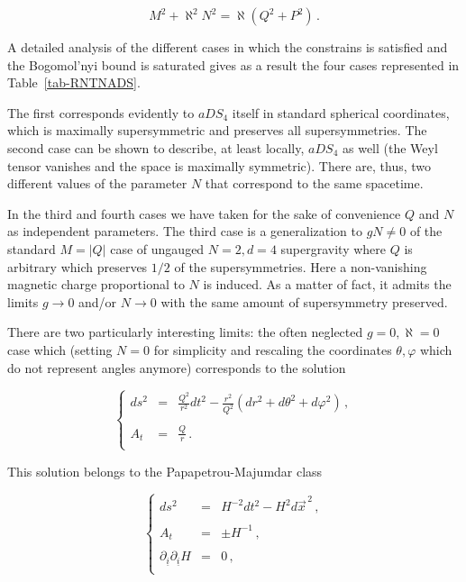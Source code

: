 \documentclass[12pt,a4paper]{article}
\begin{document}
\begin{equation}
M^{2} +\aleph^{2}N^{2}= \aleph (Q^{2}+P^{2})\, .  
\end{equation}

A detailed analysis of the different cases in which the constrains is
satisfied and the Bogomol'nyi bound is saturated gives as a result the
four cases represented in Table~\ref{tab-RNTNADS}. 

The first corresponds evidently to $aDS_{4}$ itself in standard
spherical coordinates, which is maximally supersymmetric and
preserves all supersymmetries. The second case can be shown to
describe, at least locally, $aDS_{4}$ as well (the Weyl tensor
vanishes and the space is maximally symmetric). There are, thus, two
different values of the parameter $N$ that correspond to the same
spacetime.

In the third and fourth cases we have taken for the sake of
convenience $Q$ and $N$ as independent parameters.  The third case is
a generalization to $gN\neq 0$ of the standard $M=|Q|$ case of
ungauged $N=2,d=4$ supergravity where $Q$ is arbitrary which preserves
$1/2$ of the supersymmetries. Here a non-vanishing magnetic charge
proportional to $N$ is induced.  As a matter of fact, it admits the
limits $g\rightarrow 0$ and/or $N\rightarrow 0$ with the same amount
of supersymmetry preserved. 

There are two particularly interesting limits: the often neglected
$g=0,\aleph=0$ case which (setting $N=0$ for simplicity and rescaling
the coordinates $\theta,\varphi$ which do not represent angles
anymore) corresponds to the solution

\begin{equation}
\left\{
\begin{array}{rcl}
ds^{2} & = & {\displaystyle\frac{Q^{2}}{r^{2}}} dt^{2}
- {\displaystyle\frac{r^{2}}{Q^{2}}}
\left(dr^{2} +d\theta^{2} +d\varphi^{2} \right)\, ,\\
& & \\
A_{t} & = & {\displaystyle \frac{Q}{r}}\, .\\
\end{array}
\right.
\end{equation}

This solution belongs to the Papapetrou-Majumdar class

\begin{equation}
\left\{
\begin{array}{rcl}
ds^{2} & = & H^{-2}dt^{2} -H^{2}d\vec{x}^{\, 2}\, ,\\
& & \\
A_{t} & = & \pm H^{-1}\, ,\\
& & \\
\partial_{\underline{i}}\partial_{\underline{i}} H & = & 0\, ,\\
\end{array}
\right.
\end{equation}
\end{document}
